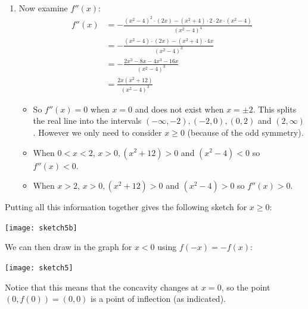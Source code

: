 \begin{eg}[$f(x) = \dfrac{x}{x^2-4}$]
\begin{enumerate}[(1)]
\begin{itemize}
\end{itemize}
\item Now examine $f''(x)$:
\begin{align*}
f''(x)
&=- \frac{(x^2-4)^2\cdot(2x) - (x^2+4)\cdot2\cdot 2x\cdot(x^2-4)}{(x^2-4)^4}\\
&=- \frac{(x^2-4)\cdot(2x) - (x^2+4)\cdot4x}{(x^2-4)^3}\\
&=- \frac{2x^3-8x  - 4x^3-16x}{(x^2-4)^3}\\
&= \frac{2x(x^2+12)}{(x^2-4)^3}
\end{align*}
\begin{itemize}
\item So $f''(x)=0$ when $x=0$ and does not exist when $x=\pm 2$. This splits
the real line into the intervals $(-\infty,-2), (-2,0), (0,2)$ and
$(2,\infty)$. However we only need to consider $x \geq 0$ (because of the odd
symmetry).
 \item When $0<x<2$, $x>0, (x^2+12)>0$ and $(x^2-4)<0$ so  $f''(x)<0$.
 \item When $x>2$, $x>0, (x^2+12)>0$ and $(x^2-4)>0$ so $f''(x)>0$.
\end{itemize}
\end{enumerate}
Putting all this information together gives the following sketch for $x \geq 0$:
\begin{efig}
\begin{center}
   \texttt{[image: sketch5b]}
\end{center}
\end{efig}
We can then draw in the graph for $x< 0$ using $f(-x) = -f(x)$:
\begin{efig}
\begin{center}
   \texttt{[image: sketch5]}
\end{center}
\end{efig}
Notice that this means that the concavity changes at $x=0$, so the point
$(0,f(0))=(0,0)$ is a point of inflection (as indicated).
\end{eg}




